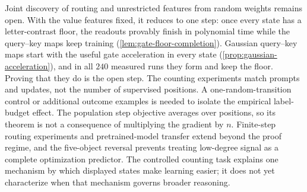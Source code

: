 Joint discovery of routing and unrestricted features from random weights remains open. With the value features fixed, it
reduces to one step: once every state has a letter-contrast floor, the readouts provably finish in polynomial time while the
query--key maps keep training (\cref{lem:gate-floor-completion}). Gaussian query--key maps start with the useful gate acceleration in
every state (\cref{prop:gaussian-acceleration}), and in all $240$ measured runs they form and keep the floor. Proving that they do is the open step.
The counting experiments match prompts and updates, not the number of supervised
positions. A one-random-transition control or additional outcome examples is needed
to isolate the empirical label-budget effect. The population step objective averages
over positions, so its theorem is not a consequence of multiplying the gradient by $n$.
Finite-step routing experiments and pretrained-model transfer extend beyond the proof regime,
and the five-object reversal prevents treating low-degree signal as a complete optimization
predictor. The controlled counting task explains one mechanism by which displayed states
make learning easier; it does not yet characterize when that mechanism governs broader reasoning.
